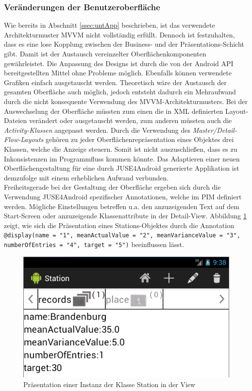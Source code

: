 \documentclass[a4paper,twoside]{article}
\begin{document}
\subsubsection{Veränderungen der Benutzeroberfläche}
Wie bereits in Abschnitt \ref{ssec:untApp} beschrieben, ist das verwendete Architekturmuster MVVM nicht vollständig erfüllt. Dennoch ist festzuhalten, dass es eine lose Kopplung zwischen der Business- und der Präsentations-Schicht gibt. Damit ist der Austausch vereinzelter Oberflächenkomponenten gewährleistet. Die Anpassung des Designs ist durch die von der Android API bereitgestellten Mittel ohne Probleme möglich. Ebenfalls können verwendete Grafiken einfach ausgetauscht werden. Theoretisch wäre der Austausch der gesamten Oberfläche auch möglich, jedoch entsteht dadurch ein Mehraufwand durch die nicht konsequente Verwendung des MVVM-Architekturmusters. Bei der Auswechselung der Oberfläche müssten zum einen die in XML definierten Layout-Dateien verändert oder ausgetauscht werden, zum anderen müssten auch die \textit{Activity-Klassen} angepasst werden. Durch die Verwendung des \textit{Master/Detail-Flow-Layouts} gehören zu jeder Oberflächenrepräsentation eines Objektes drei Klassen, welche die Anzeige steuern. Somit ist nicht auszuschließen, dass es zu Inkonsistenzen im Programmfluss kommen könnte. Das Adaptieren einer neuen Oberflächengestaltung für eine durch JUSE4Android generierte Applikation ist demzufolge mit einem erheblichen Aufwand verbunden.
\\

Freiheitsgerade bei der Gestaltung der Oberfläche ergeben sich durch die Verwendung JUSE4Android spezifischer Annotationen, welche im PIM definiert werden. Mögliche Einstellungen betreffen u.a. den anzuzeigenden Text auf dem Start-Screen oder anzuzeigende Klassenattribute in der Detail-View. \cite[S.19]{SilvaMasterThesis} Abbildung \ref{fig:StationView} zeigt, wie sich die Präsentation eines Stations-Objektes durch die Annotation \texttt{@display(name = "1", meanActualValue = "2", meanVarianceValue = "3", numberOfEntries = "4", target = "5")} beeinflussen lässt.
\begin{figure}[!h]
	\centering
	\includegraphics[scale=.6]{pics/StationView.png}
	\caption{Präsentation einer Instanz der Klasse Station in der View}
	\label{fig:StationView}
\end{figure}
\end{document}
